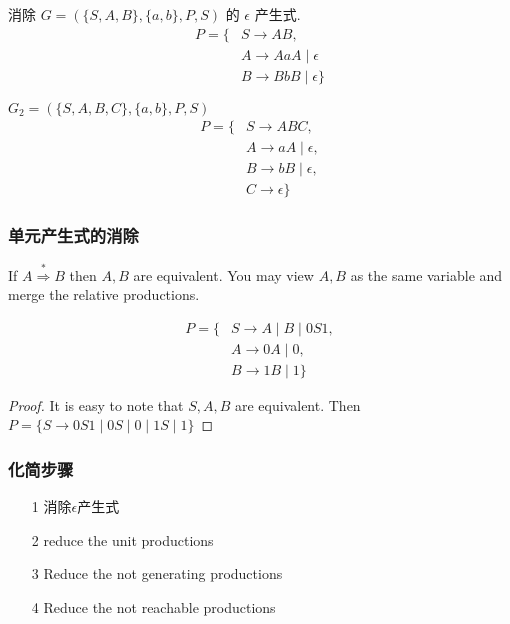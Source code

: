 \documentclass[../main_part1.tex]{subfiles}
\begin{document}
\begin{exam}
	消除 \(G = ( \{ S ,A , B \} , \{ a, b \} , P , S )\) 的 \( \epsilon\) 产生式. 
	\begin{equation}
	\begin{aligned}
		P = \{ & S \to A B  , \\ 
		       & A \to A a A \mid \epsilon \\
		       & B \to B b B \mid \epsilon \}
	\end{aligned}
	\end{equation}
\end{exam}

\begin{exam}
	\(G_{2} = ( \{ S , A  , B , C \} , \{ a, b \} , P , S )\) 
	\begin{equation}
	\begin{aligned}
		P = \{ & S \to A B C , \\ 
		       & A \to a A \mid \epsilon , \\ 
		       & B \to b B \mid \epsilon , \\
		       & C \to \epsilon \}
	\end{aligned}
	\end{equation}
\end{exam}


\subsubsection{单元产生式的消除}
If \(A \overset{*}{\Rightarrow} B\) then \(A, B\) are equivalent. You may view \(A, B\) as the same variable and merge the relative productions.

\begin{exam}
	\begin{equation}
	\begin{aligned}
		P = \{ & S \to A \mid B \mid 0S 1 , \\ 
		       & A \to 0 A \mid 0 ,  \\ 
		       & B \to 1 B \mid 1 \}
	\end{aligned}
	\end{equation}
\end{exam}
\begin{proof}
It is easy to note that \(S, A , B \) are equivalent. Then 
\(P = \{ S \to 0S1 \mid 0 S \mid 0 \mid 1 S \mid 1\}\)
\end{proof}

\subsubsection{化简步骤}

\begin{enumerate}
\item [1]  消除\(\epsilon\)产生式
\item [2]  reduce the unit productions
\item [3] Reduce the not generating productions
\item [4] Reduce the not reachable productions
\end{enumerate}

\end{document}
